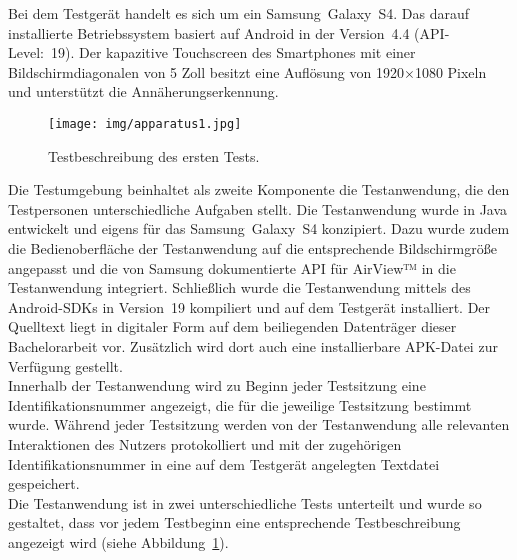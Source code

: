 \documentclass[12pt,numbers=noenddot,parskip,bibliography=totocnumbered,listof=totocnumbered]{scrreprt}
\begin{document}
Bei dem Testgerät handelt es sich um ein \mbox{Samsung Galaxy S4}. Das darauf installierte Betriebssystem basiert auf Android in der \mbox{Version 4.4} \mbox{(API-Level: 19)}. Der kapazitive Touchscreen des Smartphones mit einer Bildschirmdiagonalen von 5 Zoll besitzt eine Auflösung von \mbox{1920$\times$1080} Pixeln und unterstützt die Annäherungserkennung.

\begin{figure}
\centering
\texttt{[image: img/apparatus1.jpg]}
\caption{Testbeschreibung des ersten Tests.}
\label{apparattestbeschreibung}
\end{figure}
Die Testumgebung beinhaltet als zweite Komponente die Testanwendung, die den Testpersonen unterschiedliche Aufgaben stellt. Die Testanwendung wurde in Java entwickelt und eigens für das \mbox{Samsung Galaxy S4} konzipiert. Dazu wurde zudem die Bedienoberfläche der Testanwendung auf die entsprechende Bildschirmgröße angepasst und die von Samsung dokumentierte API für \mbox{AirView™} in die Testanwendung integriert. Schließlich wurde die Testanwendung mittels des Android-SDKs in \mbox{Version 19} kompiliert und auf dem Testgerät installiert. Der Quelltext liegt in digitaler Form auf dem beiliegenden Datenträger dieser Bachelorarbeit vor. Zusätzlich wird dort auch eine installierbare APK-Datei zur Verfügung gestellt.\\
Innerhalb der Testanwendung wird zu Beginn jeder Testsitzung eine Identifikationsnummer angezeigt, die für die jeweilige Testsitzung bestimmt wurde. Während jeder Testsitzung werden von der Testanwendung alle relevanten Interaktionen des Nutzers protokolliert und mit der zugehörigen Identifikationsnummer in eine auf dem Testgerät angelegten Textdatei gespeichert.\\
Die Testanwendung ist in zwei unterschiedliche Tests unterteilt und wurde so gestaltet, dass vor jedem Testbeginn eine entsprechende Testbeschreibung angezeigt wird (siehe Abbildung~\ref{apparattestbeschreibung}).
\end{document}
